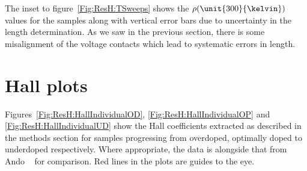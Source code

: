 The inset to figure~\ref{Fig:ResH:TSweeps} shows the $\rho(\unit{300}{\kelvin})$ values for the samples along with vertical error bars due to uncertainty in the length determination. As we saw in the previous section, there is some misalignment of the voltage contacts which lead to systematic errors in length.




\section{Hall plots}

Figures~\ref{Fig:ResH:HallIndividualOD}, \ref{Fig:ResH:HallIndividualOP} and \ref{Fig:ResH:HallIndividualUD} show the Hall coefficients extracted as described in the methods section for samples progressing from overdoped, optimally doped to underdoped respectively. Where appropriate, the data is alongside that from Ando \etal~\cite{Ando1999} for comparison. Red lines in the plots are guides to the eye.

